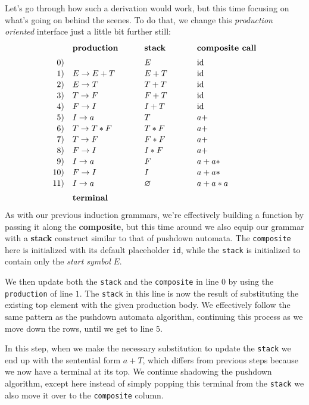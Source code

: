 \documentclass[twoside]{article}
\newcommand{\strong}[1]{{\bfseries #1}}
\newcommand{\bfmbox}[1]{\mbox{\bfseries #1}}
\newcommand{\tab}[1][1.125cm]{\hspace{#1}}
\newcommand{\col}[1][0ex]{& \hspace{#1}}
\newcommand{\id}{\mbox{id}}
\begin{document}
Let's go through how such a derivation would work, but this time focusing on what's going on behind the scenes.
To do that, we change this \emph{production oriented} interface just a little bit further still:
$$ \def\arraystretch{1.1}
\tab[0cm] \begin{array}{rlll}
	& \bfmbox{production}	\col[5ex] \bfmbox{stack}	\col[6ex] \bfmbox{composite call}	\\[1ex]
 0)	& 			\col[5ex] E			\col[6ex] \id				\\
 1)	& E \to E+T		\col[5ex] E+T			\col[6ex] \id				\\
 2)	& E \to T		\col[5ex] T+T			\col[6ex] \id				\\
 3)	& T \to F		\col[5ex] F+T			\col[6ex] \id				\\
 4)	& F \to I		\col[5ex] I+T			\col[6ex] \id				\\
 5)	& I \to a		\col[5ex] T  			\col[6ex] a+   				\\
 6)	& T \to T*F		\col[5ex] T*F			\col[6ex] a+				\\
 7)	& T \to F		\col[5ex] F*F			\col[6ex] a+				\\
 8)	& F \to I		\col[5ex] I*F			\col[6ex] a+				\\
 9)	& I \to a		\col[5ex] F			\col[6ex] a+a*				\\
10)	& F \to I		\col[5ex] I			\col[6ex] a+a*				\\
11)	& I \to a		\col[5ex] \varnothing		\col[6ex] a+a*a				\\[1ex]
	& \bfmbox{terminal}
\end{array} $$
As with our previous induction grammars, we're effectively building a function by passing it along the \strong{composite},
but this time around we also equip our grammar with a \strong{stack} construct similar to that of pushdown automata.
The \texttt{composite} here is initialized with its default placeholder \texttt{id}, while the \texttt{stack} is
initialized to contain only the \emph{start symbol} $ E $.

We then update both the \texttt{stack} and the \texttt{composite} in line $ 0 $ by using the \texttt{production}
of line $ 1 $. The \texttt{stack} in this line is now the result of substituting the existing top element with the
given production body. We effectively follow the same pattern as the pushdown automata algorithm, continuing
this process as we move down the rows, until we get to line $ 5 $.

In this step, when we make the necessary substitution to update the \texttt{stack} we end up with the sentential form
$ a+T $, which differs from previous steps because we now have a terminal at its top. We continue shadowing the pushdown
algorithm, except here instead of simply popping this terminal from the \texttt{stack} we also move it
over to the \texttt{composite} column.
\end{document}
